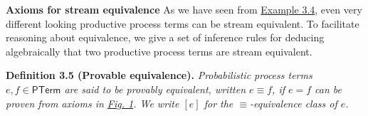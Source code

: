 \par\medskip
\hypertarget{html:S3.SS0.SSS0.Px2}{} \par\noindent\textbf{Axioms for stream equivalence}\quad  %
\hypertarget{html:S3.SS0.SSS0.Px2.p1}{} As we have seen from \hyperlink{html:S3.Thmtheorem4}{Example 3.4}, even very different looking productive process terms can be stream equivalent. To facilitate reasoning about equivalence, we give a set of inference rules for deducing algebraically that two productive process terms are stream equivalent.
\par\medskip
\hypertarget{html:S3.Thmtheorem5}{} \par\noindent\textbf{\textbf{Definition 3.5}\textbf{ }(Provable equivalence)\textbf{.}}\quad  %
\hypertarget{html:S3.Thmtheorem5.p1}{} \emph{Probabilistic process terms %
\hypertarget{html:S3.Thmtheorem5.p1.m1}{}\({e,f\in\mathsf{PTerm}}\) are said to be \emph{provably equivalent}, written %
\hypertarget{html:S3.Thmtheorem5.p1.m2}{}\({e\equiv f}\), if %
\hypertarget{html:S3.Thmtheorem5.p1.m3}{}\({e=f}\) can be proven from axioms in \hyperlink{html:S3.F1}{Fig. 1}. We write %
\hypertarget{html:S3.Thmtheorem5.p1.m4}{}\({[e]}\) for the %
\hypertarget{html:S3.Thmtheorem5.p1.m5}{}\({\equiv}\)-equivalence class of %
\hypertarget{html:S3.Thmtheorem5.p1.m6}{}\({e}\).}
\par\medskip
\hypertarget{html:S3.F1}{}
